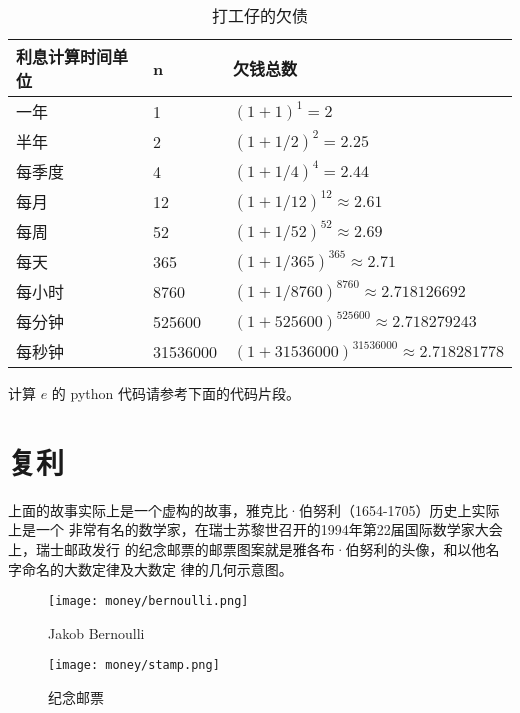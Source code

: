 \begin{table}[htbp]
\centering
\caption{打工仔的欠债}
\begin{tabular}{|l|l|l|}
\hline
利息计算时间单位 & n        & 欠钱总数                         \\ \hline
一年       & 1        & $ (1+1)^1=2 $                          \\ \hline
半年       & 2        & $ (1+1/2)^2=2.25 $                     \\ \hline
每季度      & 4        & $ (1+1/4)^4=2.44 $                    \\ \hline
每月       & 12       & $ (1+1/12)^{12} \approx 2.61 $                 \\ \hline
每周       & 52       & $ (1+1/52)^{52} \approx 2.69 $                 \\ \hline
每天       & 365      & $ (1+1/365)^{365} \approx 2.71 $               \\ \hline
每小时      & 8760     & $ (1+1/8760)^{8760} \approx 2.718126692 $     \\ \hline
每分钟      & 525600   & $ (1+525600)^{525600} \approx 2.718279243 $   \\ \hline
每秒钟      & 31536000 & $ (1+31536000)^{31536000} \approx 2.718281778 $ \\ \hline
\end{tabular}
\end{table}

计算 $e$ 的 python 代码请参考下面的代码片段。



\section{复利}

上面的故事实际上是一个虚构的故事，雅克比·伯努利（1654-1705）历史上实际上是一个
非常有名的数学家，在瑞士苏黎世召开的1994年第22届国际数学家大会上，瑞士邮政发行
的纪念邮票的邮票图案就是雅各布·伯努利的头像，和以他名字命名的大数定律及大数定
律的几何示意图。

\begin{figure}[htbp]
\centering
\begin{minipage}[t]{.45\linewidth}
\texttt{[image: money/bernoulli.png]}
\caption{Jakob Bernoulli}
\end{minipage}
\begin{minipage}[t]{.45\linewidth}
\texttt{[image: money/stamp.png]}
\caption{纪念邮票}
\end{minipage}
\end{figure}

